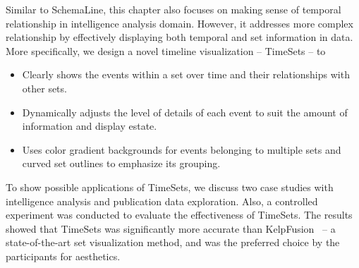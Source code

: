 Similar to SchemaLine, this chapter also focuses on making sense of temporal relationship in intelligence analysis domain. However, it addresses more complex relationship by effectively displaying both temporal and set information in data. More specifically, we design a novel timeline visualization -- TimeSets -- to

\begin{itemize}
	\item Clearly shows the events within a set over time and their relationships with other sets.
	\item Dynamically adjusts the level of details of each event to suit the amount of information and display estate.
	\item Uses color gradient backgrounds for events belonging to multiple sets and curved set outlines to emphasize its grouping.
\end{itemize}

To show possible applications of TimeSets, we discuss two case studies with intelligence analysis and publication data exploration. Also, a controlled experiment was conducted to evaluate the effectiveness of TimeSets. The results showed that TimeSets was significantly more accurate than KelpFusion~\cite{Meulemans2013} -- a state-of-the-art set visualization method, and was the preferred choice by the participants for aesthetics.